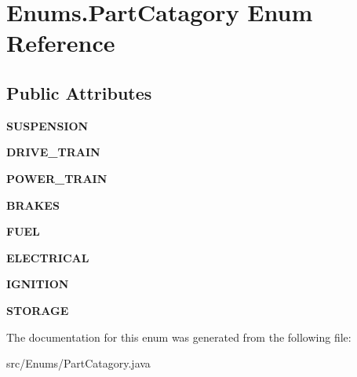 \hypertarget{enumEnums_1_1PartCatagory}{}\section{Enums.\+Part\+Catagory Enum Reference}
\label{enumEnums_1_1PartCatagory}
\subsection*{Public Attributes}
\begin{DoxyCompactItemize}
\item 
\hypertarget{enumEnums_1_1PartCatagory_a241234bd2366e76cb43fe3c153cfc72c}{}{\bfseries S\+U\+S\+P\+E\+N\+S\+I\+O\+N}\label{enumEnums_1_1PartCatagory_a241234bd2366e76cb43fe3c153cfc72c}

\item 
\hypertarget{enumEnums_1_1PartCatagory_a3b1e52804ab718efbb09a55fc276fa63}{}{\bfseries D\+R\+I\+V\+E\+\_\+\+T\+R\+A\+I\+N}\label{enumEnums_1_1PartCatagory_a3b1e52804ab718efbb09a55fc276fa63}

\item 
\hypertarget{enumEnums_1_1PartCatagory_a6a46aeb340cde3aadcabecbf393fde35}{}{\bfseries P\+O\+W\+E\+R\+\_\+\+T\+R\+A\+I\+N}\label{enumEnums_1_1PartCatagory_a6a46aeb340cde3aadcabecbf393fde35}

\item 
\hypertarget{enumEnums_1_1PartCatagory_ac8c73542d8fca2242ca571697b269119}{}{\bfseries B\+R\+A\+K\+E\+S}\label{enumEnums_1_1PartCatagory_ac8c73542d8fca2242ca571697b269119}

\item 
\hypertarget{enumEnums_1_1PartCatagory_ac51770d0c9849de28b5946b0f4c55a0e}{}{\bfseries F\+U\+E\+L}\label{enumEnums_1_1PartCatagory_ac51770d0c9849de28b5946b0f4c55a0e}

\item 
\hypertarget{enumEnums_1_1PartCatagory_a7ada07c6b7b5bf6a86771f63b1a68c7f}{}{\bfseries E\+L\+E\+C\+T\+R\+I\+C\+A\+L}\label{enumEnums_1_1PartCatagory_a7ada07c6b7b5bf6a86771f63b1a68c7f}

\item 
\hypertarget{enumEnums_1_1PartCatagory_ac7f34d5f50de583abe3b73beabfe7646}{}{\bfseries I\+G\+N\+I\+T\+I\+O\+N}\label{enumEnums_1_1PartCatagory_ac7f34d5f50de583abe3b73beabfe7646}

\item 
\hypertarget{enumEnums_1_1PartCatagory_a1b24e676fc4b6d4221763ca0949243be}{}{\bfseries S\+T\+O\+R\+A\+G\+E}\label{enumEnums_1_1PartCatagory_a1b24e676fc4b6d4221763ca0949243be}

\end{DoxyCompactItemize}


The documentation for this enum was generated from the following file\+:\begin{DoxyCompactItemize}
\item 
src/\+Enums/Part\+Catagory.\+java\end{DoxyCompactItemize}
